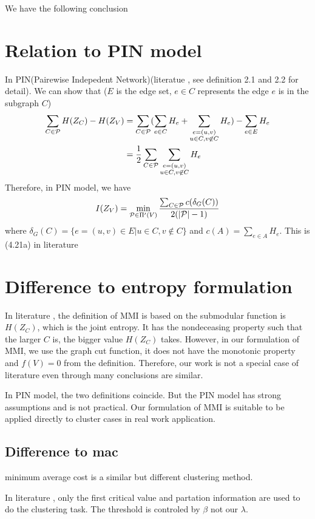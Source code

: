 \documentclass{article}
\begin{document}
We have the following conclusion
\section{Relation to PIN model}
In PIN(Pairewise Indepedent Network)(literatue \cite{pin}, see definition 2.1 and 2.2 for detail).
We can show that ($E$ is the edge set, $e \in C$ represents the edge $e$ is in the subgraph $C$)
\begin{align*}
\sum_{C \in \P} H(Z_C) - H(Z_V) & = \sum_{C \in \P} (\sum_{e \in C} H_e + \sum_{\substack{e = (u,v) \\ u \in C, v\not\in C }} H_e) - \sum_{e \in E} H_e \\
& = {1 \over 2}\sum_{C \in \P}  \sum_{\substack{e = (u,v) \\ u \in C, v\not\in C }} H_e
\end{align*}
Therefore, in PIN model, we have
\begin{equation}
I(Z_V) = \min_{ \P \in \Pi'(V)} \frac{ \sum_{C \in \P} c(\delta_{G}(C))}{2(\abs{\P} - 1 )}
\end{equation}
where $\delta_{G}(C) = \{e = (u, v) \in E | u \in C, v \not\in C\} $ and $c(A) = \sum_{e\in A} H_e$.
This is (4.21a) in literature \cite{ic}
\section{Difference to entropy formulation}
In literature \cite{ic}, the definition of MMI is based on the submodular function is $H(Z_C)$, which is the joint entropy. It has the nondeceasing property such that the larger $C$ is, the bigger value $H(Z_C)$ takes. However, in our formulation of MMI, we use the graph cut function, it does not have the monotonic property and $f(V) = 0$ from the definition. Therefore, our work is not a special case of literature \cite{ic} even through many conclusions are similar.

In PIN model, the two definitions coincide. But the PIN model has strong assumptions and is not practical. Our formulation of MMI is suitable to be applied directly to cluster cases in real work application.
\subsection{Difference to mac}
minimum average cost is a similar but different clustering method.

In literature \cite{mac}, only the first critical value and partation information are used to do the clustering task. The threshold is controled by $\beta$ not our $\lambda$.
\end{document}
